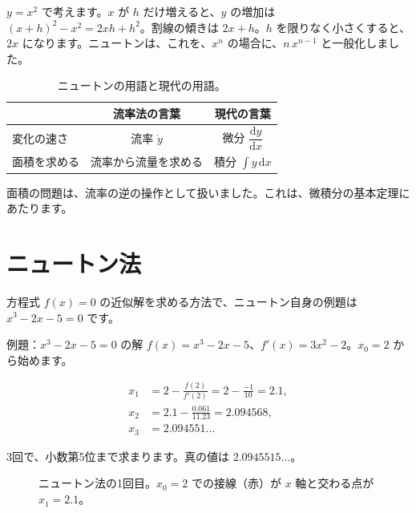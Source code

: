 \documentclass[a4paper,11pt,openany]{ltjsbook}
\newcommand{\dd}{\mathrm{d}}
\begin{document}
$y=x^2$ で考えます。$x$ が $h$ だけ増えると、$y$ の増加は $(x+h)^2-x^2=2xh+h^2$。割線の傾きは $2x+h$。$h$ を限りなく小さくすると、$2x$ になります。ニュートンは、これを、$x^n$ の場合に、$n\,x^{n-1}$ と一般化しました。

\begin{table}[htbp]
\centering
\begin{tabular}{lcc}
\toprule
 & 流率法の言葉 & 現代の言葉\\
\midrule
変化の速さ & 流率 $\dot y$ & 微分 $\dfrac{\dd y}{\dd x}$\\
面積を求める & 流率から流量を求める & 積分 $\displaystyle\int y\,\dd x$\\
\bottomrule
\end{tabular}
\caption{ニュートンの用語と現代の用語。}
\end{table}

面積の問題は、流率の逆の操作として扱いました。これは、微積分の基本定理にあたります。

\section{ニュートン法}

方程式 $f(x)=0$ の近似解を求める方法で、ニュートン自身の例題は $x^3-2x-5=0$ です。

\begin{examplebox}{例題：$x^3-2x-5=0$ の解}
$f(x)=x^3-2x-5$、$f'(x)=3x^2-2$。$x_0=2$ から始めます。

\begin{align*}
x_1&=2-\frac{f(2)}{f'(2)}=2-\frac{-1}{10}=2.1,\\
x_2&=2.1-\frac{0.061}{11.23}=2.094568,\\
x_3&=2.094551\ldots
\end{align*}

3回で、小数第5位まで求まります。真の値は $2.0945515\ldots$。
\end{examplebox}

\begin{figure}[htbp]
\centering
{}
\caption{ニュートン法の1回目。$x_0=2$ での接線（赤）が $x$ 軸と交わる点が $x_1=2.1$。}
\end{figure}
\end{document}
